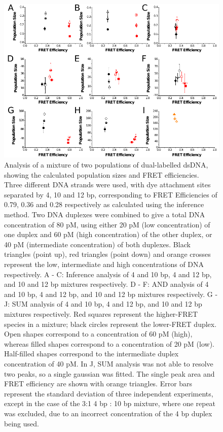 \begin{figure}
   \begin{center}
      \includegraphics*[width=5in]{inference/fig7_all_ratios.pdf}
      \caption{Analysis of a mixture of two populations of dual-labelled dsDNA, showing the calculated population sizes and FRET efficiencies. Three different DNA strands were used, with dye attachment sites separated by 4, 10 and 12 bp, corresponding to FRET Efficiencies of 0.79, 0.36 and 0.28 respectively as calculated using the inference method. Two DNA duplexes were combined to give a total DNA concentration of 80 pM, using either 20 pM (low concentration) of one duplex and 60 pM (high concentration) of the other duplex, or 40 pM (intermediate concentration) of both duplexes. Black triangles (point up), red triangles (point down) and orange crosses represent the low, intermediate and high concentrations of DNA respectively. A - C: Inference analysis of 4 and 10 bp, 4 and 12 bp, and 10 and 12 bp mixtures respectively. D - F: AND analysis of 4 and 10 bp, 4 and 12 bp, and 10 and 12 bp mixtures respectively. G - J: SUM analysis of 4 and 10 bp, 4 and 12 bp, and 10 and 12 bp mixtures respectively. Red squares represent the higher-FRET species in a mixture; black circles represent the lower-FRET duplex. Open shapes correspond to a concentration of 60 pM (high), whereas filled shapes correspond to a concentration of 20 pM (low). Half-filled shapes correspond to the intermediate duplex concentration of 40 pM. In J, SUM analysis was not able to resolve two peaks, so a single gaussian was fitted. The single peak area and FRET efficiency are shown with orange triangles. Error bars represent the standard deviation of three independent experiments, except in the case of the 3:1 4 bp : 10 bp mixture, where one repeat was excluded, due to an incorrect concentration of the 4 bp duplex being used.}
      \label{fig:fig7_real_multi_free}
   \end{center}
\end{figure}

